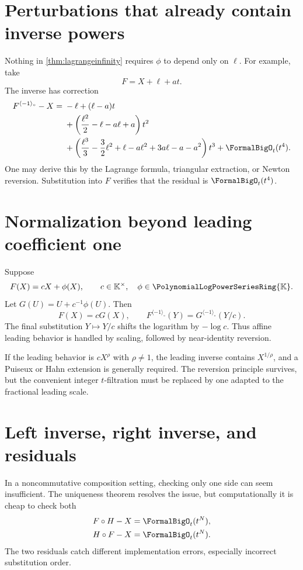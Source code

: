 \documentclass[11pt,oneside,openany]{book}
\newcommand{\K}{\mathbb{K}}
\newcommand{\Rring}{\PolynomialLogPowerSeriesRing{\K}}
\newcommand{\compose}{\mathbin{\circ}}
\newcommand{\rev}{^{\langle-1\rangle_{\circ}}}
\begin{document}
\section{Perturbations that already contain inverse powers}
Nothing in \cref{thm:lagrangeinfinity} requires \(\phi\) to depend only on
\(\ell\).  For example, take
\begin{equation}\label{eq:phiwitha}
 F=X+\ell+a t.
\end{equation}
The inverse has correction
\begin{align}
 F\rev-X={}&-\ell+(\ell-a)t\notag\\
 &+\left(\frac{\ell^2}{2}-\ell-a\ell+a\right)t^2\notag\\
 &+\left(
   \frac{\ell^3}{3}-\frac32\ell^2+\ell
   -a\ell^2+3a\ell-a-a^2
   \right)t^3
 +\FormalBigO_t(t^4).
 \label{eq:inversewitha}
\end{align}
One may derive this by the Lagrange formula, triangular extraction, or Newton
reversion.  Substitution into \(F\) verifies that the residual is
\(\FormalBigO_t(t^4)\).

\section{Normalization beyond leading coefficient one}
Suppose
\begin{equation}\label{eq:affineleading}
 F(X)=cX+\phi(X),
 \qquad c\in\K^\times,
 \quad \phi\in\Rring.
\end{equation}
Let \(G(U)=U+c^{-1}\phi(U)\).  Then
\[
 F(X)=cG(X),
 \qquad
 F\rev(Y)=G\rev(Y/c).
\]
The final substitution \(Y\mapsto Y/c\) shifts the logarithm by
\(-\log c\).  Thus affine leading behavior is handled by scaling, followed by
near-identity reversion.

If the leading behavior is \(cX^\rho\) with \(\rho\neq1\), the leading inverse
contains \(X^{1/\rho}\), and a Puiseux or Hahn extension is generally required.
The reversion principle survives, but the convenient integer \(t\)-filtration
must be replaced by one adapted to the fractional leading scale.

\section{Left inverse, right inverse, and residuals}
In a noncommutative composition setting, checking only one side can seem
insufficient.  The uniqueness theorem resolves the issue, but computationally
it is cheap to check both
\begin{align}
 F\compose H-X&=\FormalBigO_t(t^N),
 \label{eq:rightresidual}\\
 H\compose F-X&=\FormalBigO_t(t^N).
 \label{eq:leftresidual}
\end{align}
The two residuals catch different implementation errors, especially incorrect
substitution order.
\end{document}
